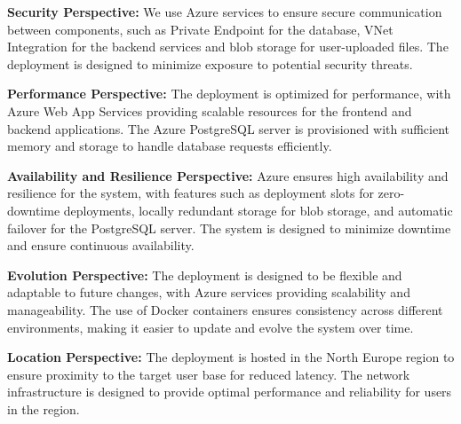 \textbf{Security Perspective:} We use Azure services to ensure secure communication between components, such as Private Endpoint for the database, VNet Integration for the backend services and blob storage for user-uploaded files. The deployment is designed to minimize exposure to potential security threats.

\textbf{Performance Perspective:} The deployment is optimized for performance, with Azure Web App Services providing scalable resources for the frontend and backend applications. The Azure PostgreSQL server is provisioned with sufficient memory and storage to handle database requests efficiently.

\textbf{Availability and Resilience Perspective:} Azure ensures high availability and resilience for the system, with features such as deployment slots for zero-downtime deployments, locally redundant storage for blob storage, and automatic failover for the PostgreSQL server. The system is designed to minimize downtime and ensure continuous availability.

\textbf{Evolution Perspective:} The deployment is designed to be flexible and adaptable to future changes, with Azure services providing scalability and manageability. The use of Docker containers ensures consistency across different environments, making it easier to update and evolve the system over time.

\textbf{Location Perspective:} The deployment is hosted in the North Europe region to ensure proximity to the target user base for reduced latency. The network infrastructure is designed to provide optimal performance and reliability for users in the region.
